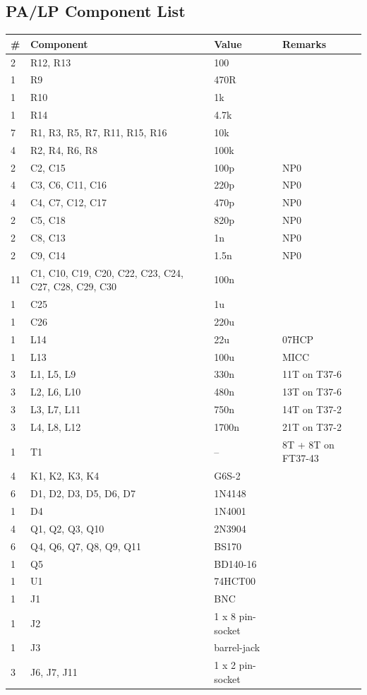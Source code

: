 \documentclass[10pt, a4paper,twoside,openright]{scrartcl}
\begin{document}
\subsection{PA/LP Component List}  \label{sec:pacomp}
\begin{longtable}{|l|p{6cm}|l|l|} \hline 
\# & Component & Value & Remarks \\ \hline 
2 & R12, R13 & 100 & \\
1 & R9 & 470R & \\
1 & R10 & 1k & \\
1 & R14 & 4.7k & \\
7 & R1, R3, R5, R7, R11, R15, R16 & 10k & \\
4 & R2, R4, R6, R8 & 100k & \\
2 & C2, C15 & 100p & NP0 \\
4 & C3, C6, C11, C16 & 220p & NP0 \\
4 & C4, C7, C12, C17 & 470p & NP0 \\
2 & C5, C18 & 820p & NP0 \\
2 & C8, C13 & 1n & NP0 \\
2 & C9, C14 & 1.5n & NP0 \\
11 & C1, C10, C19, C20, C22, C23, C24, C27, C28, C29, C30 & 100n & \\
1 & C25 & 1u & \\
1 & C26 & 220u & \\
1 & L14 & 22u & 07HCP \\
1 & L13 & 100u & MICC \\
3 & L1, L5, L9 & 330n & 11T on T37-6 \\
3 & L2, L6, L10 & 480n & 13T on T37-6 \\
3 & L3, L7, L11 & 750n & 14T on T37-2 \\
3 & L4, L8, L12 & 1700n & 21T on T37-2 \\
1 & T1 & -- & 8T + 8T on FT37-43 \\
4 & K1, K2, K3, K4 & G6S-2 & \\
6 & D1, D2, D3, D5, D6, D7 & 1N4148 & \\
1 & D4 & 1N4001 & \\	
4 & Q1, Q2, Q3, Q10 & 2N3904 & \\
6 & Q4, Q6, Q7, Q8, Q9, Q11 & BS170 & \\
1 & Q5 & BD140-16 & \\
1 & U1 & 74HCT00 & \\
1 & J1 & BNC & \\
1 & J2 & 1 x 8 pin-socket & \\
1 & J3 & barrel-jack & \\
3 & J6, J7, J11 & 1 x 2 pin-socket & \\ \hline
\end{longtable}
\end{document}

